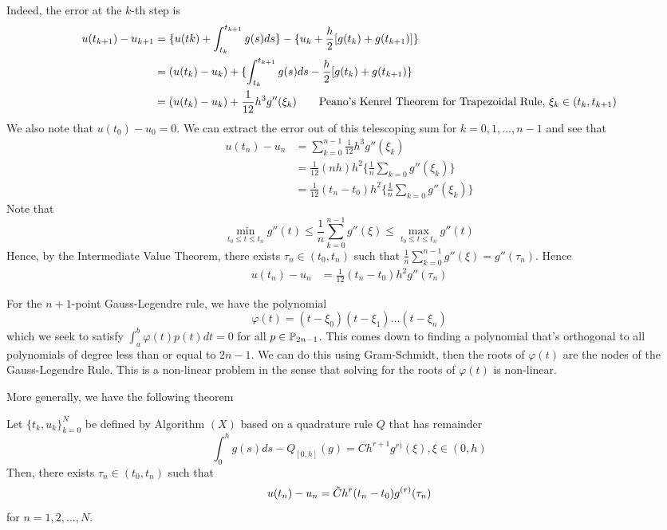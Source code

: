 \documentclass{article}
\begin{document}
Indeed, the error at the $k$-th step is
\begin{align*}
    u(t_{k+1}) - u_{k+1} &= \{ u(tk) + \int_{t_k}^{t_{k + 1}} g(s) ds\} - \{u_k + \frac{h}{2} [g(t_k) + g(t_{k+1})]\}\\
    &= (u(t_k) - u_k) + \{\int_{t_k}^{t_{k+1}} g(s) ds - \frac{h}{2} [g(t_k) + g(t_{k+1})\}\\
    &= (u(t_k) - u_k) + \frac{1}{12} h^3 g''(\xi_k) \tag*{Peano's Kenrel Theorem for Trapezoidal Rule, $\xi_k \in (t_k, t_{k+1})$}
\end{align*}
We also note that $u(t_0) - u_0 = 0$. We can extract the error out of this telescoping sum for $k = 0, 1, ..., n-1$ and see that
\begin{align*}
    u(t_n) - u_n &= \sum_{k=0}^{n-1} \frac{1}{12} h^3 g''(\xi_k)\\
    &= \frac{1}{12}(nh) h^2 \{\frac{1}{n} \sum_{k = 0} g''(\xi_k)\}\\
    &= \frac{1}{12} (t_n - t_0) h^2 \{\frac{1}{n} \sum_{k = 0} g''(\xi_k)\}
\end{align*}
Note that
\[\min_{t_0 \leq t \leq t_n} g''(t) \leq \frac{1}{n} \sum_{k = 0}^{n-1} g''(\xi) \leq \max_{t_0 \leq t \leq t_n} g''(t)\]
Hence, by the Intermediate Value Theorem, there exists $\tau_n \in (t_0, t_n)$ such that $\frac{1}{n} \sum_{k = 0}^{n-1} g''(\xi) = g''(\tau_n)$. Hence
\begin{align*}
    u(t_n) - u_n &= \frac{1}{12} (t_n - t_0) h^2 g''(\tau_n)
\end{align*}

\begin{remark}
For the $n+1$-point Gauss-Legendre rule, we have the polynomial
$$\varphi(t) = (t - \xi_0) (t - \xi_1) ... (t - \xi_n)$$
which we seek to satisfy
$\int_a^b \varphi(t) p(t) dt = 0$ for all $p \in \mathbb{P}_{2n - 1}$. This comes down to finding a polynomial that's orthogonal to all polynomials of degree less than or equal to $2n - 1$. We can do this using Gram-Schmidt, then the roots of $\varphi(t)$ are the nodes of the Gauss-Legendre Rule. This is a non-linear problem in the sense that solving for the roots of $\varphi(t)$ is non-linear.
\end{remark}

More generally, we have the following theorem
\begin{theorem}
    Let $\{t_k, u_k\}_{k = 0}^N$ be defined by Algorithm $(X)$ based on a quadrature rule $Q$ that has remainder 
    \[\int_0^h g(s) ds - Q_{[0, h]}(g) = C h^{r+1} g^{r)}(\xi), \xi \in (0, h)\]
    Then, there exists $\tau_n \in (t_0, t_n)$ such that
    \[u(t_n) - u_n = \Tilde{C} h^r (t_n - t_0) g^{(r)}(\tau_n)\]
    for $n = 1, 2, ..., N$.
\end{theorem}
\end{document}
